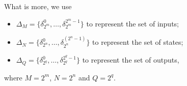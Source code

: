     What is more, we use 
   \begin{itemize}
 \item $\Delta_M=\{\delta^0_{2^m},\ldots,\delta^{{2^m}-1}_{2^m} \}$ to represent the set of inputs; 
 \item $\Delta_N=\{\delta^0_{2^n},\ldots,\delta^{({2^n}-1)}_{2^n} \}$ to represent the set of states; 
  \item $\Delta_Q=\{\delta^0_{2^q},\ldots,\delta^{{2^q}-1}_{2^q} \}$ to represent the set of outputs,
\end{itemize}
where $M=2^m$, $N=2^n$ and $Q=2^q$.
